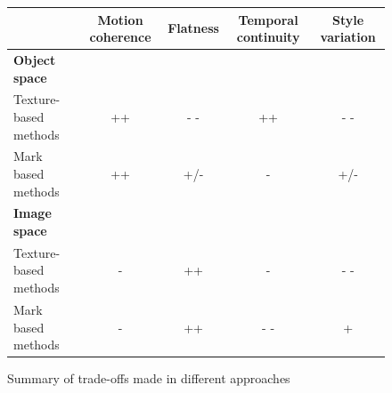 \begin{figure}

    \begin{tabular}{|l|*{4}{c|}}
    \hline
         & \textbf{Motion coherence} & \textbf{Flatness} & \textbf{Temporal continuity} & \textbf{Style variation} \\
    \hline
    \textbf{Object space} & & & & \\
    \hline
    Texture-based methods & ++ & - - & ++ & - - \\
    \hline
    Mark based methods & ++ & +/- & - & +/- \\
    \hline
    \textbf{Image space} & & & & \\
    \hline
    Texture-based methods & -  & ++ & - & - - \\
    \hline
    Mark based methods & - & ++ & - - & + \\
    \hline
    \end{tabular}

    \caption{Summary of trade-offs made in different approaches}
    \label{tableau_comparatif}
\end{figure}
